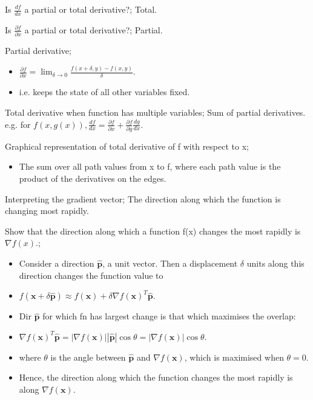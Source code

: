 \documentclass{article}
\begin{document}
Is $\frac{df}{dx}$ a partial or total derivative?; Total.

Is $\frac{\partial f}{\partial x}$ a partial or total derivative?; Partial.

Partial derivative; \begin{itemize} \item $\frac{\partial f}{\partial x} = \lim_{\delta\rightarrow 0} \frac{f(x+\delta, y)-f(x,y)}{\delta}$.  \item i.e. keeps the state of all other variables fixed. \end{itemize} 

Total derivative when function has multiple variables; Sum of partial derivatives. e.g. for $f(x, g(x)), \frac{df}{dx} = \frac{\partial f}{\partial x} + \frac{\partial f}{\partial g}\frac{dg}{dx}$.

Graphical representation of total derivative of f with respect to x; \begin{itemize} \item The sum over all path values from x to f, where each path value is the product of the derivatives on the edges. \end{itemize}

Interpreting the gradient vector; The direction along which the function is changing most rapidly.

Show that the direction along which a function f(x) changes the most rapidly is $\nabla f(x)$.; \begin{itemize} \item Consider a direction $\mathbf{\hat p}$, a unit vector. Then a displacement $\delta$ units along this direction changes the function value to  \item $f(\mathbf{x}+\delta\mathbf{\hat p}) \approx f(\mathbf{x})+\delta\nabla f(\mathbf{x})^T \mathbf{\hat p}$. \item Dir $\mathbf{\hat{p}}$ for which fn has largest change is that which maximises the overlap: \item $\nabla f(\mathbf{x})^T \mathbf{\hat{p}} = |\nabla f(\mathbf{x})||\hat{\mathbf{p}}|\cos\theta = |\nabla  f(\mathbf{x})|\cos\theta$. 	\item where $\theta$ is the angle between $\mathbf{\hat p}$ and $\nabla  f(\mathbf{x})$, which is maximised when $\theta=0$.  \item Hence, the direction along which the function changes the most rapidly is along $\nabla f(\mathbf{x})$. \end{itemize}
\end{document}
